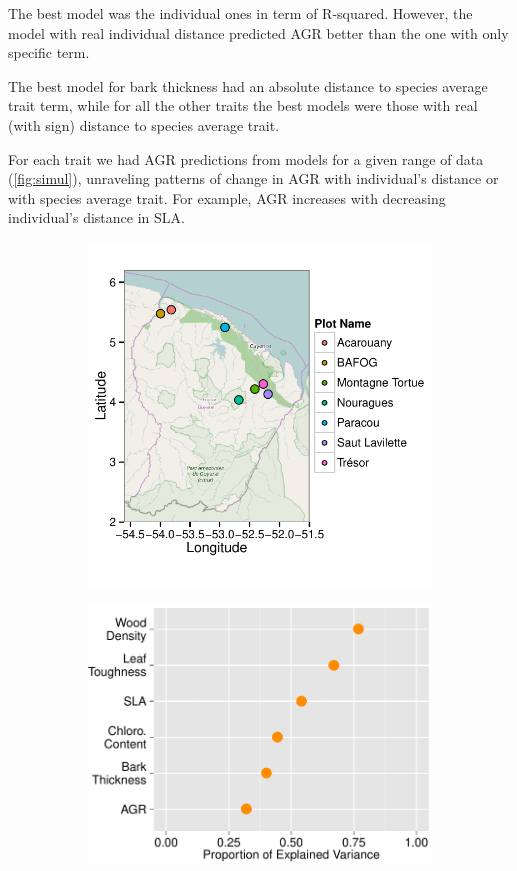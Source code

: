 The best model was the individual ones in term of R-squared. However, the model with real individual distance predicted AGR better than the one with only specific term.

The best model for bark thickness had an absolute distance to species average trait term, while for all the other traits the best models were those with real (with sign) distance to species average trait.

For each trait we had AGR predictions from models for a given range of data (\autoref{fig:simul}), unraveling patterns of change in AGR with individual's distance or with species average trait. For example, AGR increases with decreasing individual's distance in SLA.

\begin{figure}[!ht]
	\centering
	\begin{subfigure}[c]{0.45\textwidth}
		\includegraphics[scale=0.75]{figures/Plots_Map_2015-05-26.pdf}
		\caption{}
		\label{fig:map}
	\end{subfigure}
	\begin{subfigure}[c]{0.5\textwidth}
		\includegraphics[scale=0.7]{figures/Aov_Var_Traits_2015-05-25.pdf}

\end{subfigure}
\end{figure}

